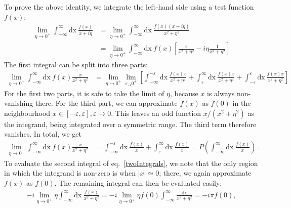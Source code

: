 \documentclass[reprint,hidelinks,onecolumn]{revtex4-2}
\begin{document}
To prove the above identity, we integrate the left-hand side using a test function \(f(x)\):
\begin{equation}\begin{aligned}\label{twoIntegrals}
	\lim_{\eta \to 0^+}\int_{-\infty}^{\infty} \text{dx}~\frac{f(x)}{x + i \eta} &= \lim_{\eta \to 0^+}\int_{-\infty}^{\infty} \text{dx}~\frac{f(x)\left( x - i\eta \right) }{x^2 + \eta^2} \\
																				 &= \lim_{\eta \to 0^+}\int_{-\infty}^{\infty} \text{dx}~f(x)\left[\frac{x}{x^2 + \eta^2} - i\eta\frac{1}{x^2 + \eta^2}\right]
\end{aligned}\end{equation}
The first integral can be split into three parts:
\begin{equation}\begin{aligned}
	\lim_{\eta \to 0^+}\int_{-\infty}^{\infty} \text{dx}~f(x)\frac{x}{x^2 + \eta^2} &= \lim_{\eta \to 0^+}\lim_{\varepsilon_\to 0^+}\left[\int_{-\infty}^{-\varepsilon} \text{dx}~\frac{f(x) x}{x^2 + \eta^2} + \int_{\varepsilon}^{\infty} \text{dx}~\frac{f(x)x}{x^2 + \eta^2} + \int_{-\varepsilon}^{\varepsilon} \text{dx}~\frac{f(x)x}{x^2 + \eta^2}\right]
\end{aligned}\end{equation}
For the first two parts, it is safe to take the limit of \(\eta\), because \(x\) is always non-vanishing there. For the third part, we can approximate \(f(x)\) as \(f(0)\) in the neighbourhood \(x \in \left[-\varepsilon, \varepsilon\right], \varepsilon \to 0 \). This leaves an odd function \(x/(x^2 + \eta^2)\) as the integrand, being integrated over a symmetric range. The third term therefore vanishes. In total, we get
\begin{equation}\begin{aligned}\label{integral1}
	\lim_{\eta \to 0^+}\int_{-\infty}^{\infty} \text{dx}~f(x)\frac{x}{x^2 + \eta^2} &= \int_{-\infty}^{-\varepsilon} \text{dx}~\frac{f(x)}{x} + \int_{\varepsilon}^{\infty} \text{dx}~\frac{f(x)}{x}  = P\left(\int_{-\infty}^{\infty} \text{dx}~\frac{f(x)}{x}\right) ~.
\end{aligned}\end{equation}
To evaluate the second integral of eq.~\ref{twoIntegrals}, we note that the only region in which the integrand is non-zero is when \(|x| \simeq 0\); there, we again approximate \(f(x)\) as \(f(0)\). The remaining integral can then be evaluated easily:
\begin{equation}\begin{aligned}\label{integral2}
	-i\lim_{\eta \to 0^+}\eta\int_{-\infty}^{\infty} \text{dx}~\frac{f(x)}{x^2 + \eta^2} = -i \lim_{\eta \to 0^+}\eta f(0)\int_{-\infty}^{\infty} \frac{\text{dx}}{x^2 + \eta^2} = -i \pi f(0),
\end{aligned}\end{equation}
\end{document}
